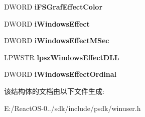 \begin{DoxyCompactItemize}
D\+W\+O\+RD {\bfseries i\+F\+S\+Graf\+Effect\+Color}
\item 
\mbox{\label{structtag_s_o_u_n_d_s_e_n_t_r_y_w_a875352255c08c9fa3d6463cecbe47637}} 
D\+W\+O\+RD {\bfseries i\+Windows\+Effect}
\item 
\mbox{\label{structtag_s_o_u_n_d_s_e_n_t_r_y_w_a7ae2a34fd84985aff8195acd29e68ebc}} 
D\+W\+O\+RD {\bfseries i\+Windows\+Effect\+M\+Sec}
\item 
\mbox{\label{structtag_s_o_u_n_d_s_e_n_t_r_y_w_aed1d014884850b0375a21d0c9c2f167d}} 
L\+P\+W\+S\+TR {\bfseries lpsz\+Windows\+Effect\+D\+LL}
\item 
\mbox{\label{structtag_s_o_u_n_d_s_e_n_t_r_y_w_a79f8101c5dc50ef7410e5e09ad90fc05}} 
D\+W\+O\+RD {\bfseries i\+Windows\+Effect\+Ordinal}
\end{DoxyCompactItemize}


该结构体的文档由以下文件生成\+:\begin{DoxyCompactItemize}
\item 
E\+:/\+React\+O\+S-\/0../sdk/include/psdk/winuser.\+h\end{DoxyCompactItemize}
